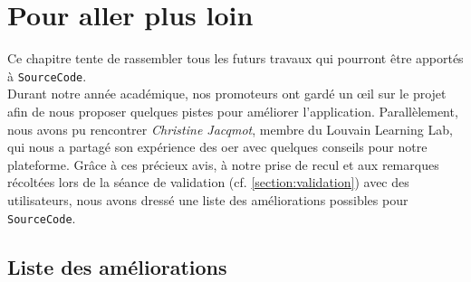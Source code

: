 \chapter{Pour aller plus loin}
\label{chapter:pourAllerPlusLoin}

Ce chapitre tente de rassembler tous les futurs travaux qui pourront être apportés à \texttt{SourceCode}.\\

Durant notre année académique, nos promoteurs ont gardé un œil sur le projet afin de nous proposer quelques pistes pour améliorer l'application.
Parallèlement, nous avons pu rencontrer \textit{Christine Jacqmot}, membre du Louvain Learning Lab, qui nous a partagé son expérience des \gls{oer} avec quelques conseils pour notre plateforme. 
Grâce à ces précieux avis, à notre prise de recul et aux remarques récoltées lors de la séance de validation (cf. \ref{section:validation}) avec des utilisateurs, nous avons dressé une liste des améliorations possibles pour \texttt{SourceCode}.

\section{Liste des améliorations}

